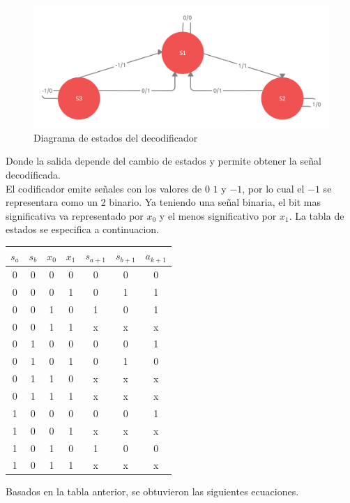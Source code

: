 \begin{figure}[H]
    \centering
    \includegraphics[width=1\textwidth]{laboratorioMLT3/imagenes/Untitled Workspace (2).png}
    \caption{\label{deco}Diagrama de estados del decodificador}
\end{figure}

Donde la salida depende del cambio de estados y permite obtener la señal decodificada.\\
El codificador emite señales con los valores de $0$ $1$ y $-1$, por lo cual el $-1$ se representara como un 2 binario. Ya teniendo una señal binaria, el bit mas significativa va representado por $x_0$ y el menos significativo por $x_1$. La tabla de estados se especifica a continuacion.

\vspace{0.6cm}
\begin{tabular}{| c | c | c | c | c | c | c |}
\hline
 $s_a$ & $s_b$ & $x_0$ & $x_1$ & $s_{a+1}$ & $s_{b+1}$ & $a_{k+1}$\\ \hline
0 & 0 & 0 & 0 & 0 & 0 & 0 \\
0 & 0 & 0 & 1 & 0 & 1 & 1 \\
0 & 0 & 1 & 0 & 1 & 0 & 1 \\
0 & 0 & 1 & 1 & x & x & x \\
0 & 1 & 0 & 0 & 0 & 0 & 1 \\
0 & 1 & 0 & 1 & 0 & 1 & 0 \\
0 & 1 & 1 & 0 & x & x & x \\
0 & 1 & 1 & 1 & x & x & x \\
1 & 0 & 0 & 0 & 0 & 0 & 1 \\
1 & 0 & 0 & 1 & x & x & x \\
1 & 0 & 1 & 0 & 1 & 0 & 0 \\
1 & 0 & 1 & 1 & x & x & x \\
\hline
\end{tabular}
\vspace{0.2cm}

Basados en la tabla anterior, se obtuvieron las siguientes ecuaciones.

